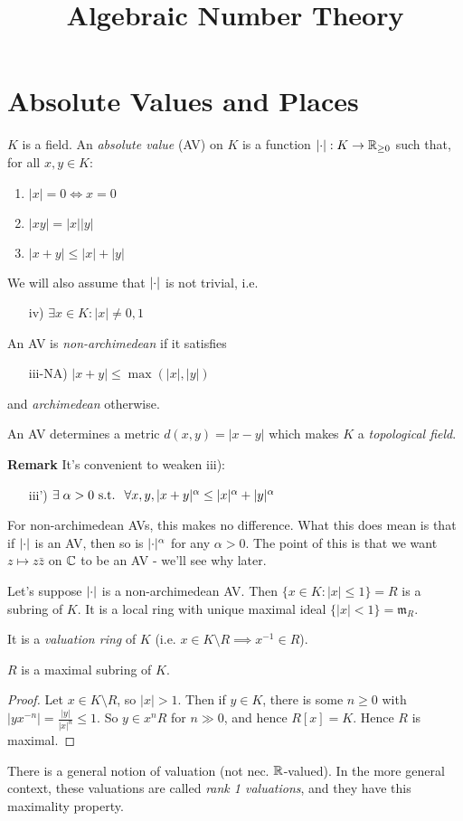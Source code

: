 \documentclass[10pt,a4paper]{article}
\title{Algebraic Number Theory}
\begin{document}
\maketitle
\tableofcontents
\newpage
\section{Absolute Values and Places}
$K$ is a field. An \emph{absolute value} (AV) on $K$ is a function $\lvert\cdot\rvert:K \to \mathbb{R}_{\geq 0}$ such that, for all $x, y \in K$:
\begin{enumerate}[label=\roman*)]
  \item $|x| = 0 \iff x= 0$
  \item $|xy| = |x||y|$
  \item $|x+y| \leq |x|+|y|$
\end{enumerate}
We will also assume that $\lvert\cdot\rvert$ is not trivial, i.e.
\begin{enumerate}
  \item[iv)] $\exists x \in K : |x|\neq 0,1$
\end{enumerate}
An AV is \emph{non-archimedean} if it satisfies
\begin{enumerate}
  \item[iii-NA)] $|x+y| \leq \max(|x|, |y|)$
\end{enumerate}
and \emph{archimedean} otherwise.

An AV determines a metric $d(x,y) = |x-y|$ which makes $K$ a \emph{topological field}.

\textbf{Remark} It's convenient to weaken iii):
\begin{enumerate}
  \item[iii')] $\exists \alpha > 0 \st \forall x,y, |x+y|^{\alpha} \leq |x|^\alpha+|y|^\alpha$
\end{enumerate}
For non-archimedean AVs, this makes no difference. What this does mean is that if $\lvert\cdot\rvert$ is an AV, then so is $\lvert\cdot\rvert^{\alpha}$ for any $\alpha > 0$. The point of this is that we want $z \mapsto z\bar{z}$ on $\mathbb{C}$ to be an AV - we'll see why later.

Let's suppose $\lvert\cdot\rvert$ is a non-archimedean AV. Then $\{x\in K : |x|\leq 1\} = R$ is a subring of $K$. It is a local ring with unique maximal ideal $\{|x|<1\} = \mathfrak{m}_R$.

It is a \emph{valuation ring} of $K$ (i.e. $x \in K \setminus R \implies x^{-1}\in R$).
\begin{lemma}
  $R$ is a maximal subring of $K$.
\end{lemma}
\begin{proof}
  Let $x \in K\setminus R$, so $|x|>1$. Then if $y \in K$, there is some $n \geq 0$ with $|yx^{-n}| = \frac{|y|}{|x|^n} \leq 1$. So $y \in x^n R$ for $n \gg 0$, and hence $R[x] = K$. Hence $R$ is maximal.
\end{proof}
There is a general notion of valuation (not nec. $\mathbb{R}$-valued). In the more general context, these valuations are called \emph{rank 1 valuations}, and they have this maximality property.
\end{document}
